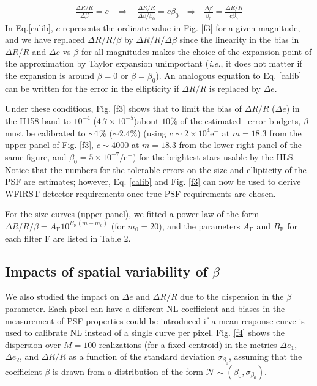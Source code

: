 \documentclass[11pt,preprint,flushrt]{aastex}
\begin{document}
\begin{align}
\frac{\Delta R/R}{\Delta \beta} = c \ \ \ \  \Rightarrow \ \ \ \ \frac{\Delta R/R}{\Delta \beta / \beta_0} = c \beta_0  \ \ \   \Rightarrow \ \ \
\frac{\Delta \beta}{\beta_0} = \frac{\Delta R/R}{c \beta_0}
\label{calib}
\end{align}
In Eq.\ref{calib}, $c$ represents the ordinate value in Fig. \ref{f3} for a given magnitude, and we have replaced $\Delta R/R/\beta$ by $\Delta R/R/ \Delta \beta$ since the linearity in the bias in $\Delta R/R$ and $\Delta e$ vs $\beta$ for all magnitudes makes the choice of the expansion point of the approximation by Taylor expansion unimportant (\emph{i.e.}, it does not matter if the expansion is around $\beta=0$ or $\beta=\beta_0$). An analogous equation to Eq. \ref{calib} can be written for the error in the ellipticity if $\Delta R/R$ is replaced by $\Delta e$. 

Under these conditions, Fig. \ref{f3} shows that to limit the bias of $\Delta R/R$ ($\Delta e$) in the H158 band to $10^{-4}$  ($4.7\times 10^{-5}$)\textemdash about $10\%$ of the estimated \wf\ error budgets, $\beta$ must be calibrated to $\sim1\%$ ($\sim 2.4\%$) (using $c\sim2\times10^4 \mathrm{e^-}$ at $m=18.3$ from the upper panel of Fig. \ref{f3}, $c\sim4000$ at $m=18.3$ from the lower right panel of the same figure, and $\beta_0=5\times10^{-7}/\mathrm{e^-}$) for the brightest stars usable by the HLS. Notice that the numbers for the tolerable errors on the size and ellipticity of the PSF are estimates; however, Eq. \ref{calib} and Fig. \ref{f3} can now be used to derive WFIRST detector requirements once true PSF requirements are chosen.

For the size curves (upper panel), we fitted a power law of the form $\Delta R/ R/ \beta = A_{\text{F}} 10^{B_{\text{F}} (m - m_{0})}$ (for $m_0 =20$), and the parameters $A_{\text{F}}$ and $B_{\text{F}}$ for each filter F are listed in Table 2. 

\subsection{Impacts of spatial variability of $\beta$}
We also studied the impact on $\Delta e$ and $\Delta R/R$ due to the dispersion in the $\beta$ parameter. Each pixel can have a different NL coefficient and biases in the measurement of PSF properties could be introduced if a mean response curve is used to calibrate NL instead of a single curve per pixel. Fig. \ref{f4} shows the dispersion over $M=100$ realizations (for a fixed centroid) in the metrics $\Delta e_1$,  $\Delta e_2$, and  $\Delta R/R$  as a function of the standard deviation $ \sigma_{\beta_0}$, assuming that the coefficient $\beta$ is drawn from a distribution of the form $\mathcal{N} \sim (\beta_0, \sigma_{\beta_0})$. 
\end{document}

